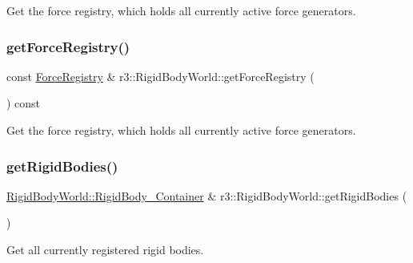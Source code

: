 Get the force registry, which holds all currently active force generators. \mbox{\label{classr3_1_1_rigid_body_world_a5ec345de8bdc6e910797434de918dbc2}} 
\subsubsection{\texorpdfstring{get\+Force\+Registry()}{getForceRegistry()}\hspace{0.1cm}{\footnotesize\ttfamily [2/2]}}
{\footnotesize\ttfamily const \mbox{\hyperlink{classr3_1_1_force_registry}{Force\+Registry}} \& r3\+::\+Rigid\+Body\+World\+::get\+Force\+Registry (\begin{DoxyParamCaption}{ }\end{DoxyParamCaption}) const}

Get the force registry, which holds all currently active force generators. \mbox{\label{classr3_1_1_rigid_body_world_a31e9a0ddd26c25327aa21b3460c52893}} 
\subsubsection{\texorpdfstring{get\+Rigid\+Bodies()}{getRigidBodies()}\hspace{0.1cm}{\footnotesize\ttfamily [1/2]}}
{\footnotesize\ttfamily \mbox{\hyperlink{classr3_1_1_rigid_body_world_abe8c123eee198b6f8eca079e71302bcb}{Rigid\+Body\+World\+::\+Rigid\+Body\+\_\+\+Container}} \& r3\+::\+Rigid\+Body\+World\+::get\+Rigid\+Bodies (\begin{DoxyParamCaption}{ }\end{DoxyParamCaption})}

Get all currently registered rigid bodies. \mbox{\label{classr3_1_1_rigid_body_world_abf3bfd4b5d7ed2e843362e555b9eebb2}} 
